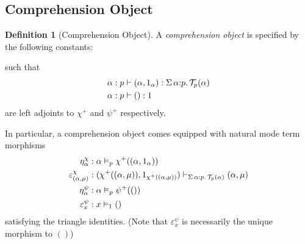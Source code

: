 \documentclass[10pt]{article}
\theoremstyle{definition}
\newtheorem{definition}{Definition}
\newcommand{\yields}{\vdash}
\newcommand{\type}{\,\,\mathsf{mode}}
\newcommand{\sigmacl}[3]{\ensuremath{\textnormal{$\Sigma$}\,#1{:}#2.\,#3}}
\newcommand\TypeTwo[4]{\ensuremath{#1 \mid #3 \vDash #2 : #4}}
\newcommand\TrPlus[2]{\ensuremath{{#1}^+(#2)}}
\newcommand\El[2]{\mathcal{T}_{#1}(#2)}
\begin{document}
\subsection{Comprehension Object}
\newcommand\var[1]{\ensuremath{\mathtt{var}_{#1}}}
\newcommand\ApOne[1]{\ensuremath{1_{\langle {#1} \rangle }}}


\begin{definition}[Comprehension Object]\label{def:comprehension-object}
  A \emph{comprehension object} is specified by the following
  constants:
  such that
\begin{align*}
\alpha : p &\yields (\alpha, 1_\alpha) : \sigmacl{\alpha}{p}{\El{p}{\alpha}} \\
\alpha : p &\yields () : 1
\end{align*}
are left adjoints to $\chi^+$ and $\psi^+$ respectively.
\end{definition}

In particular, a comprehension object comes equipped with natural mode term morphisms
\begin{align*}
\eta^\chi_\alpha {}&: \alpha \vDash_p \TrPlus{\chi}{(\alpha, 1_\alpha)} \\
\varepsilon^\chi_{(\alpha, \mu)} {}&: (\TrPlus{\chi}{(\alpha, \mu)}, 1_{\TrPlus{\chi}{(\alpha, \mu)}}) \yields_{\sigmacl{\alpha}{p}{\El{p}{\alpha}}} (\alpha, \mu) \\
\eta^\psi_\alpha {}&: \alpha \vDash_p \TrPlus{\psi}{()} \\
\varepsilon^\psi_{x} {}&: x \vDash_1 ()
\end{align*}
satisfying the triangle identities. (Note that $\varepsilon^\psi_x$ is necessarily the unique morphism to $()$)
\end{document}
